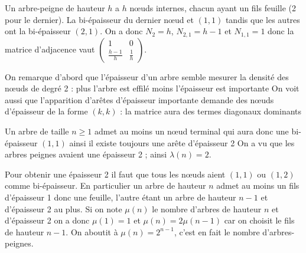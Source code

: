 \begin{Exercise} Un arbre-peigne de hauteur $h$ a $h$ nœuds internes, chacun ayant un fils feuille (2 pour le dernier). La bi-épaisseur du dernier nœud et $(1,1)$ tandis que les autres ont la bi-épaisseur $(2,1)$. On a donc $N_2 = h$, $N_{2,1}=h-1$ et $N_{1,1} = 1$ donc la matrice d'adjacence vaut $\begin{pmatrix} 1&0 \\ \frac{h-1}h&\frac 1h \end{pmatrix}$.
\end{Exercise}
\begin{Exercise}
	On remarque d'abord que l'épaisseur d'un arbre semble mesurer la densité des n{\oe}uds de degré 2 : plus l'arbre est effilé moins l'épaisseur est importante On voit aussi que l'apparition d'arêtes d'épaisseur importante demande des n{\oe}uds d'épaisseur de la forme $(k, k)$ : la matrice aura des termes diagonaux dominants 
\end{Exercise}
\begin{Exercise}
	Un arbre de taille $n\ge 1$ admet au moins un n{\oe}ud terminal qui aura donc une bi-épaisseur $(1,1)$  ainsi il existe toujours une arête d'épaisseur 2 On a vu que les arbres peignes avaient une épaisseur 2 ; ainsi $\lambda(n) = 2$.
	
	Pour obtenir une épaisseur 2 il faut que tous les n{\oe}uds aient $(1,1)$ ou $(1,2)$ comme bi-épaisseur. En particulier un arbre de hauteur $n$ admet au moins un fils d'épaisseur 1 donc une feuille, l'autre étant un arbre de hauteur $n-1$ et d'épaisseur 2 au plus. Si on note $\mu(n)$ le nombre d'arbres de hauteur $n$ et d'épaisseur 2 on a donc $\mu(1) = 1$ et $\mu(n) = 2\mu(n-1)$ car on choisit le fils de hauteur $n-1$. On aboutit à $\mu(n)=2^{n-1}$, c'est en fait le nombre d'arbres-peignes.
\end{Exercise}
